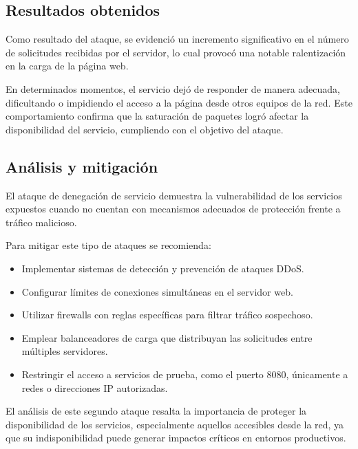 \subsection{Resultados obtenidos}

Como resultado del ataque, se evidenció un incremento significativo en el número de solicitudes recibidas por el servidor, lo cual provocó una notable ralentización en la carga de la página web.

En determinados momentos, el servicio dejó de responder de manera adecuada, dificultando o impidiendo el acceso a la página desde otros equipos de la red. Este comportamiento confirma que la saturación de paquetes logró afectar la disponibilidad del servicio, cumpliendo con el objetivo del ataque.

\subsection{Análisis y mitigación}

El ataque de denegación de servicio demuestra la vulnerabilidad de los servicios expuestos cuando no cuentan con mecanismos adecuados de protección frente a tráfico malicioso.

Para mitigar este tipo de ataques se recomienda:

\begin{itemize}
    \item Implementar sistemas de detección y prevención de ataques DDoS.
    \item Configurar límites de conexiones simultáneas en el servidor web.
    \item Utilizar firewalls con reglas específicas para filtrar tráfico sospechoso.
    \item Emplear balanceadores de carga que distribuyan las solicitudes entre múltiples servidores.
    \item Restringir el acceso a servicios de prueba, como el puerto 8080, únicamente a redes o direcciones IP autorizadas.
\end{itemize}

El análisis de este segundo ataque resalta la importancia de proteger la disponibilidad de los servicios, especialmente aquellos accesibles desde la red, ya que su indisponibilidad puede generar impactos críticos en entornos productivos.
